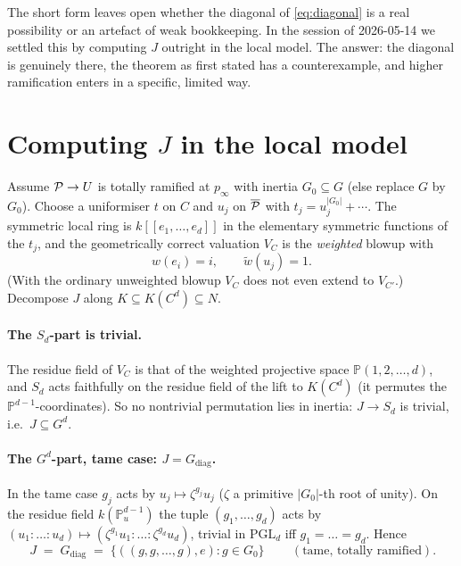 \documentclass[11pt]{article}
\providecommand{\PP}{\mathbb{P}}
\begin{document}
\noindent The short form leaves open whether the diagonal of \cref{eq:diagonal}
is a real possibility or an artefact of weak bookkeeping. In the session of
2026-05-14 we settled this by computing $J$ outright in the local model. The
answer: the diagonal is genuinely there, the theorem as first stated has a
counterexample, and higher ramification enters in a specific, limited way.

\section{Computing \texorpdfstring{$J$}{J} in the local model}\label{sec:localmodel}

Assume $\mathcal{P}\to U$ is totally ramified at $p_\infty$ with inertia
$G_0\subseteq G$ (else replace $G$ by $G_0$). Choose a uniformiser $t$ on $C$
and $u_j$ on $\overline{\mathcal{P}}$ with $t_j=u_j^{|G_0|}+\cdots$. The symmetric local
ring is $k[[e_1,\dots,e_d]]$ in the elementary symmetric functions of the
$t_j$, and the geometrically correct valuation $V_C$ is the \emph{weighted}
blowup with
\[
w(e_i)=i ,\qquad \widetilde w(u_j)=1 .
\]
(With the ordinary unweighted blowup $V_C$ does not even extend to $V_{C'}$.)
Decompose $J$ along $K\subseteq K(C^d)\subseteq N$.

\paragraph{The $S_d$-part is trivial.}
The residue field of $V_C$ is that of the weighted projective space
$\PP(1,2,\dots,d)$, and $S_d$ acts faithfully on the residue field of the lift
to $K(C^d)$ (it permutes the $\PP^{d-1}$-coordinates). So no nontrivial
permutation lies in inertia: $J\to S_d$ is trivial, i.e.\ $J\subseteq G^d$.

\paragraph{The $G^d$-part, tame case: $J=G_{\mathrm{diag}}$.}
In the tame case $g_j$ acts by $u_j\mapsto\zeta^{g_j}u_j$ ($\zeta$ a primitive
$|G_0|$-th root of unity). On the residue field $k(\PP^{d-1}_u)$ the tuple
$(g_1,\dots,g_d)$ acts by
$(u_1:\dots:u_d)\mapsto(\zeta^{g_1}u_1:\dots:\zeta^{g_d}u_d)$, trivial in
$\mathrm{PGL}_d$ iff $g_1=\dots=g_d$. Hence
\begin{equation}\label{eq:Jdiag}
\boxed{\,J \;=\; G_{\mathrm{diag}}\;=\;\{((g,g,\dots,g),e):g\in G_0\}\,}\qquad(\text{tame, totally ramified}).
\end{equation}
\end{document}
